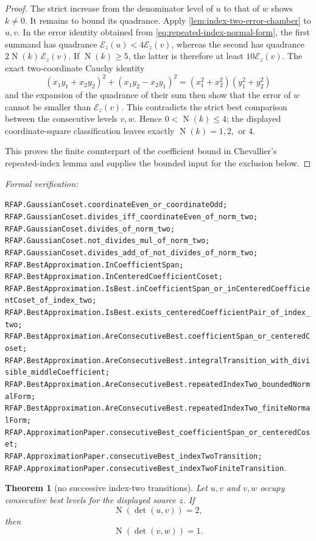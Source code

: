\documentclass[11pt]{article}
\newtheorem{theorem}{Theorem}[section]
\newcommand{\Norm}[1]{\operatorname{N}\!\left(#1\right)}
\newcommand{\leanref}[1]{\par\smallskip\noindent
  \emph{Formal verification:}\par\nobreak
  {\raggedright\nolinkurl{#1}.\par}}
\begin{document}
\begin{proof}
The strict increase from the denominator level of $u$ to that of $w$ shows
$k\ne0$.  It remains to bound its quadrance.  Apply
\cref{lem:index-two-error-chamber} to $u,v$.  In the error identity obtained
from \eqref{eq:repeated-index-normal-form}, the first summand has quadrance
$\mathcal E_z(u)<4\mathcal E_z(v)$, whereas the second has quadrance
$2\Norm k\,\mathcal E_z(v)$.  If $\Norm k\ge5$, the latter is therefore at
least $10\mathcal E_z(v)$.  The exact two-coordinate Cauchy identity
\[
 (x_1y_1+x_2y_2)^2+(x_1y_2-x_2y_1)^2
   =(x_1^2+x_2^2)(y_1^2+y_2^2)
\]
and the expansion of the quadrance of their sum then show that the error of
$w$ cannot be smaller than $\mathcal E_z(v)$.  This contradicts the strict
best comparison between the consecutive levels $v,w$.  Hence
$0<\Norm k\le4$; the displayed coordinate-square classification leaves
exactly $\Norm k=1,2,$ or $4$.

This proves the finite counterpart of the coefficient bound in Chevallier's
repeated-index lemma and supplies the bounded input for the exclusion below.
\end{proof}

\leanref{RFAP.GaussianCoset.coordinateEven_or_coordinateOdd;
RFAP.GaussianCoset.divides_iff_coordinateEven_of_norm_two;
RFAP.GaussianCoset.divides_of_norm_two;
RFAP.GaussianCoset.not_divides_mul_of_norm_two;
RFAP.GaussianCoset.divides_add_of_not_divides_of_norm_two;
RFAP.BestApproximation.InCoefficientSpan;
RFAP.BestApproximation.InCenteredCoefficientCoset;
RFAP.BestApproximation.IsBest.inCoefficientSpan_or_inCenteredCoefficientCoset_of_index_two;
RFAP.BestApproximation.IsBest.exists_centeredCoefficientPair_of_index_two;
RFAP.BestApproximation.AreConsecutiveBest.coefficientSpan_or_centeredCoset;
RFAP.BestApproximation.AreConsecutiveBest.integralTransition_with_divisible_middleCoefficient;
RFAP.BestApproximation.AreConsecutiveBest.repeatedIndexTwo_boundedNormalForm;
RFAP.BestApproximation.AreConsecutiveBest.repeatedIndexTwo_finiteNormalForm;
RFAP.ApproximationPaper.consecutiveBest_coefficientSpan_or_centeredCoset;
RFAP.ApproximationPaper.consecutiveBest_indexTwoTransition;
RFAP.ApproximationPaper.consecutiveBest_indexTwoFiniteTransition}

\begin{theorem}[no successive index-two transitions]
\label{thm:no-successive-index-two}
Let $u,v$ and $v,w$ occupy consecutive best levels for the displayed source
$z$.  If
\[
                       \Norm{\det(u,v)}=2,
\]
then
\[
                       \Norm{\det(v,w)}=1.
\]
\end{theorem}
\end{document}
